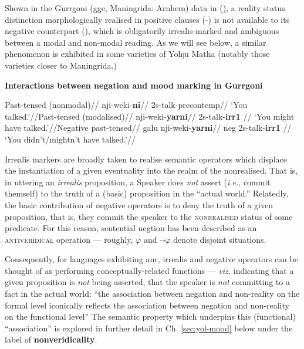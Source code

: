 Shown in the Gurrgoni (\gls{gge}, Maningrida: Arnhem) data in (), a reality status distinction morphologically realised in positive clauses (-) is not available to its negative counterpart (), which is obligatorily irrealis-marked and ambiguous between a modal and non-modal reading. As we will see below, a similar phenomenon is exhibited in some varieties of Yolŋu Matha (notably those varieties closer to Maningrida.)


	\pex{}
\textbf{Interactions between negation and mood marking in Gurrgoni} 

\a\begingl\glpreamble Past-tensed (nonmodal)//
\gla nji-weki-\textbf{ni}//
\glb 2s-talk-\gls{precontemp}//
\glft `You talked.'//\endgl \a\begingl\glpreamble Past-tensed (modalised)//
\gla nji-weki-\textbf{yarni}//
\glb 2s-talk-\textbf{\gls{irr}1}  //
\glft `You might have talked.'//\endgl	\a\begingl\glpreamble Negative past-tensed//
\gla galu nji-weki-\textbf{yarni}//
\glb \gls{neg} 2s-talk-\textbf{\gls{irr}1} //
\glft `You didn't/mightn't have talked.'//\endgl


\xe



Irrealis markers are broadly taken to realise semantic operators which displace the instantiation of a given eventuality into the realm of the nonrealised. That is, in uttering an \textit{irrealis} proposition, a Speaker does \textit{not} assert (\textit{i.e.}, commit themself) to the truth of a (basic) proposition in the ``actual world.'' Relatedly, the basic contribution of negative operators is to deny the truth of a given proposition, that is, they commit the speaker to the \textsc{nonrealised} status of some predicate. For this reason, sentential negtion has been described as an \textsc{antiveridical} operation --- roughly, $ \varphi $ and $ \neg\varphi $ denote disjoint situations.

Consequently, for languages exhibiting \acrshort{anr}, irrealis and negative operators can be thought of as performing conceptually-related functions --- \textit{viz.} indicating that a given proposition is \textit{not} being asserted, that the speaker is \textit{not} committing to a fact in the actual world: ``the association between negation and non-reality on the formal level iconically reflects the association between negation and non-reality on the functional level'' \citetext{\citealp[208]{Miestamo2005}, see also \citealp{Horn2001,Givon1975} a.o.} The semantic property which underpins this (functional) ``association'' is explored in further detail in Ch. \ref{sec:yol-mood} below under the label of \textbf{nonveridicality}.

